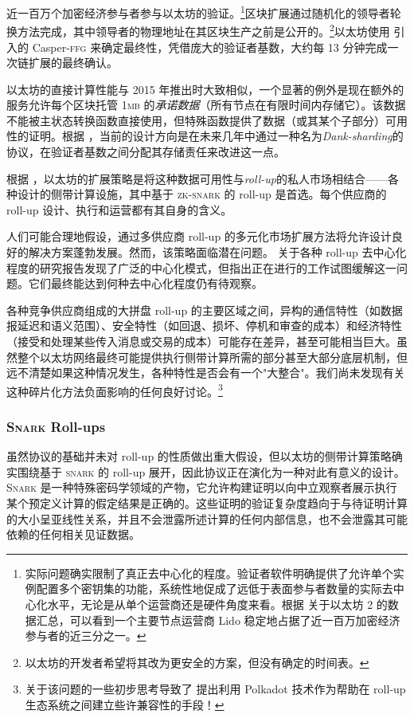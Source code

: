 近一百万个加密经济参与者参与以太坊的验证。\footnote{实际问题确实限制了真正去中心化的程度。验证者软件明确提供了允许单个实例配置多个密钥集的功能，系统性地促成了远低于表面参与者数量的实际去中心化水平，无论是从单个运营商还是硬件角度来看。根据 \cite{hildobby2024eth2} 关于以太坊 2 的数据汇总，可以看到一个主要节点运营商 Lido 稳定地占据了近一百万加密经济参与者的近三分之一。}区块扩展通过随机化的领导者轮换方法完成，其中领导者的物理地址在其区块生产之前是公开的。\footnote{以太坊的开发者希望将其改为更安全的方案，但没有确定的时间表。}以太坊使用 \cite{buterin2019casper} 引入的 Casper-\textsc{ffg} 来确定最终性，凭借庞大的验证者基数，大约每 13 分钟完成一次链扩展的最终确认。

以太坊的直接计算性能与 2015 年推出时大致相似，一个显著的例外是现在额外的服务允许每个区块托管 1\textsc{mb} 的\emph{承诺数据}（所有节点在有限时间内存储它）。该数据不能被主状态转换函数直接使用，但特殊函数提供了数据（或其某个子部分）可用性的证明。根据 \cite{ethereum2024danksharding}，当前的设计方向是在未来几年中通过一种名为\emph{Dank-sharding}的协议，在验证者基数之间分配其存储责任来改进这一点。

根据 \cite{ethereum2024sigital}，以太坊的扩展策略是将这种数据可用性与\emph{roll-up}的私人市场相结合——各种设计的侧带计算设施，其中基于 \textsc{zk-snark} 的 roll-up 是首选。每个供应商的 roll-up 设计、执行和运营都有其自身的含义。

人们可能合理地假设，通过多供应商 roll-up 的多元化市场扩展方法将允许设计良好的解决方案蓬勃发展。然而，该策略面临潜在问题。 \cite{sharma2024ethereums} 关于各种 roll-up 去中心化程度的研究报告发现了广泛的中心化模式，但指出正在进行的工作试图缓解这一问题。它们最终能达到何种去中心化程度仍有待观察。

各种竞争供应商组成的大拼盘 roll-up 的主要区域之间，异构的通信特性（如数据报延迟和语义范围）、安全特性（如回退、损坏、停机和审查的成本）和经济特性（接受和处理某些传入消息或交易的成本）可能存在差异，甚至可能相当巨大。虽然整个以太坊网络最终可能提供执行侧带计算所需的部分甚至大部分底层机制，但远不清楚如果这种情况发生，各种特性是否会有一个"大整合"。我们尚未发现有关这种碎片化方法负面影响的任何良好讨论。\footnote{关于该问题的一些初步思考导致了 \cite{sadana2024bringing} 提出利用 Polkadot 技术作为帮助在 roll-up 生态系统之间建立些许兼容性的手段！}

\subsubsection{\textsc{Snark} Roll-ups}

虽然协议的基础并未对 roll-up 的性质做出重大假设，但以太坊的侧带计算策略确实围绕基于 \textsc{snark} 的 roll-up 展开，因此协议正在演化为一种对此有意义的设计。\textsc{Snark} 是一种特殊密码学领域的产物，它允许构建证明以向中立观察者展示执行某个预定义计算的假定结果是正确的。这些证明的验证复杂度趋向于与待证明计算的大小呈亚线性关系，并且不会泄露所述计算的任何内部信息，也不会泄露其可能依赖的任何相关见证数据。

